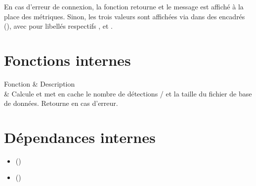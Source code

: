 \documentclass[letterpaper,10pt,english]{sphinxmanual}
\begin{document}
\sphinxAtStartPar
En cas d’erreur de connexion, la fonction retourne  et le message
 est affiché à la place
des métriques. Sinon, les trois valeurs sont affichées via  dans
des encadrés (), avec pour libellés respectifs
,  et .


\section{Fonctions internes}
\label{\detokenize{Home:fonctions-internes}}

\begin{savenotes}\sphinxattablestart
\sphinxthistablewithglobalstyle
\centering
\begin{tabular}[t]{}
\sphinxtoprule
\sphinxstyletheadfamily 
\sphinxAtStartPar
Fonction
&\sphinxstyletheadfamily 
\sphinxAtStartPar
Description
\\
\sphinxmidrule
\sphinxtableatstartofbodyhook
\sphinxAtStartPar
{}
&
\sphinxAtStartPar
Calcule et met en cache le nombre de détections / et la
taille du fichier de base de données. Retourne  en cas d’erreur.
\\
\sphinxbottomrule
\end{tabular}
\sphinxtableafterendhook\par
\sphinxattableend\end{savenotes}


\section{Dépendances internes}
\label{\detokenize{Home:dependances-internes}}\begin{itemize}
\item {} 
\sphinxAtStartPar
{\hyperref[\detokenize{api:module-models.model}]{}} ()

\item {} 
\sphinxAtStartPar
{\hyperref[\detokenize{api:module-config}]{}} ()

\end{itemize}
\end{document}

